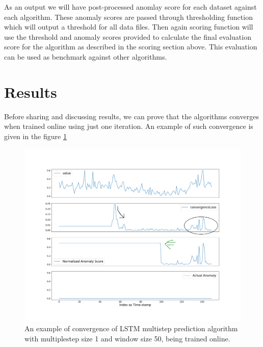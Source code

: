 \documentclass[12pt]{article}
\begin{document}
As an output we will have post-processed anomlay score for each dataset against each algorithm. These anomaly scores are passed through \cite{DBLP:journals/corr/LavinA15} thresholding function which will output a threshold for all data files. Then again \cite{DBLP:journals/corr/LavinA15} scoring function will use the threshold and anomaly scores provided to calculate the final evaluation score for the algorithm as described in the scoring section above. This evaluation can be used as benchmark against other algorithms.
\newpage
\section{Results}
Before sharing and discussing results, we can prove that the algorithms converges when trained online using just one iteration. An example of such convergence is given in the figure \ref{firstConvergenceProof}
\begin{figure}[H]
\center
        \includegraphics[width=\textwidth]{images/results/predictionMultiStepLSTMMultiStep1Window50mseconvergenceLoss12311323_realTraffic_occupancy_t4013.png}
    \caption{An example of convergence of LSTM multistep prediction algorithm with multiplestep size 1 and window size 50, being trained online.}
    \label{firstConvergenceProof}
\end{figure}
\end{document}
